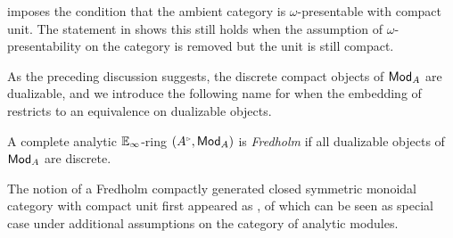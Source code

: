 \begin{remark}\label{rmk: beyond the omega-presentable case}
    \cite[Prop. 9.3]{Complex} imposes the condition that the ambient category is $\omega$-presentable with compact unit. The statement in  shows this still holds when the assumption of $\omega$-presentability on the category is removed but the unit is still compact. 
\end{remark}
As the preceding discussion suggests, the discrete compact objects of $\mathsf{Mod}_{A}$ are dualizable, and we introduce the following name for when the embedding of  restricts to an equivalence on dualizable objects. 
\begin{definition}\label{def: Fredholm rings}
    A complete analytic $\mathbb{E}_{\infty}$-ring $(A^{\tri},\Mod_{A})$ is \emph{Fredholm} if all dualizable objects of $\mathsf{Mod}_{A}$ are discrete. 
\end{definition}
\begin{remark}\label{rmk: Fredholm rings}
    The notion of a Fredholm compactly generated closed symmetric monoidal category with compact unit first appeared as \cite[Def. 9.7]{Complex}, of which  can be seen as special case under additional assumptions on the category of analytic modules. 
\end{remark}